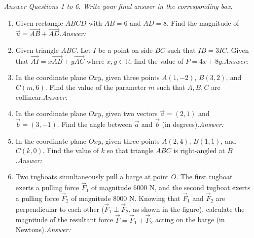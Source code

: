 \documentclass[10pt,a4paper]{article}
\newcommand{\parttitle}[1]{\par\vspace{3.5pt}\needspace{3\baselineskip}{\large\bfseries\color{ink}#1}\par\nopagebreak\vspace{2pt}}
\newcommand{\answerbox}{\hfill\mbox{\textit{Answer:}\ \fbox{\rule{0pt}{7.5pt}\hspace{1.8cm}}}}
\begin{document}
\pagebreak
\parttitle{PART III. Short-Answer Questions}
\textit{Answer Questions 1 to 6. Write your final answer in the corresponding box.}
\begin{enumerate}
\item Given rectangle $ABCD$ with $AB = 6$ and $AD = 8$. Find the magnitude of $\vec{u} = \vec{AB} + \vec{AD}$.\answerbox

\item Given triangle $ABC$. Let $I$ be a point on side $BC$ such that $IB = 3IC$. Given that $\vec{AI} = x\vec{AB} + y\vec{AC}$ where $x, y \in \mathbb{R}$, find the value of $P = 4x + 8y$.\answerbox

\item In the coordinate plane $Oxy$, given three points $A(1, -2)$, $B(3, 2)$, and $C(m, 6)$. Find the value of the parameter $m$ such that $A, B, C$ are collinear.\answerbox

\item In the coordinate plane $Oxy$, given two vectors $\vec{a} = (2, 1)$ and $\vec{b} = (3, -1)$. Find the angle between $\vec{a}$ and $\vec{b}$ (in degrees).\answerbox

\item In the coordinate plane $Oxy$, given three points $A(2, 4)$, $B(1, 1)$, and $C(k, 0)$. Find the value of $k$ so that triangle $ABC$ is right-angled at $B$.\answerbox

\item \begin{minipage}[t]{0.70\linewidth}
Two tugboats simultaneously pull a barge at point $O$. The first tugboat exerts a pulling force $\vec{F}_1$ of magnitude $6000\text{ N}$, and the second tugboat exerts a pulling force $\vec{F}_2$ of magnitude $8000\text{ N}$. Knowing that $\vec{F}_1$ and $\vec{F}_2$ are perpendicular to each other ($\vec{F}_1 \perp \vec{F}_2$, as shown in the figure), calculate the magnitude of the resultant force $\vec{F} = \vec{F}_1 + \vec{F}_2$ acting on the barge (in Newtons).\answerbox
\end{minipage}\hfill
\begin{minipage}[t]{0.28\linewidth}\raggedleft\vspace{-6pt}
\end{minipage}
\end{enumerate}
\end{document}
